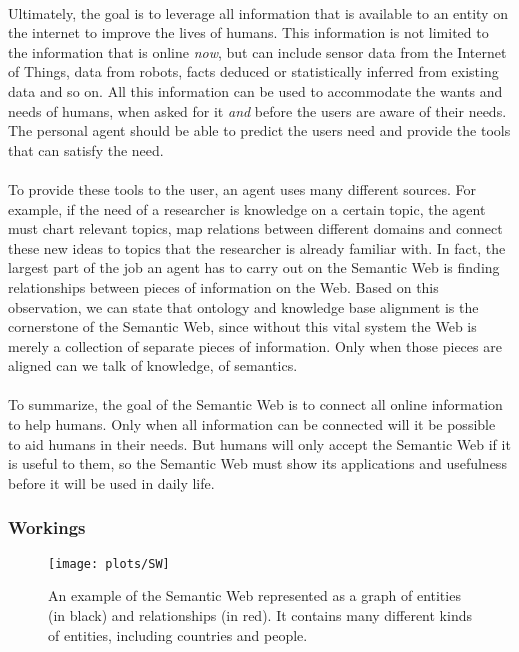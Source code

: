 \documentclass{article}
\begin{document}
 \paragraph{}
 Ultimately, the goal is to leverage all information that is available to an entity on the internet to improve the lives of humans. This information is not limited to the information that is online \emph{now}, but can include sensor data from the Internet of Things, data from robots, facts deduced or statistically inferred from existing data and so on. All this information can be used to accommodate the wants and needs of humans, when asked for it \textit{and} before the users are aware of their needs. The personal agent should be able to predict the users need and provide the tools that can satisfy the need.
 \paragraph{}
 To provide these tools to the user, an agent uses many different sources. For example, if the need of a researcher is knowledge on a certain topic, the agent must chart relevant topics, map relations between different domains and connect these new ideas to topics that the researcher is already familiar with. In fact, the largest part of the job an agent has to carry out on the Semantic Web is finding relationships between pieces of information on the Web. Based on this observation, we can state that ontology and knowledge base alignment is the cornerstone  of the Semantic Web, since without this vital system the Web is merely a collection of separate pieces of information. Only when those pieces are aligned can we talk of knowledge, of semantics.
 \paragraph{}
 To summarize, the goal of the Semantic Web is to connect all online information to help humans. Only when all information can be connected will it be possible to aid humans in their needs. But humans will only accept the Semantic Web if it is useful to them, so the Semantic Web must show its applications and usefulness before it will be used in daily life.
 \subsubsection{Workings} %
 \begin{figure}[H]
 \centering
 \texttt{[image: plots/SW]}
 \caption[Semantic Web graph]{An example of the Semantic Web represented as a graph of entities (in black) and relationships (in red). It contains many different kinds of entities, including countries and people.}
 \label{semantic_web}
 \end{figure}
 
\end{document}

